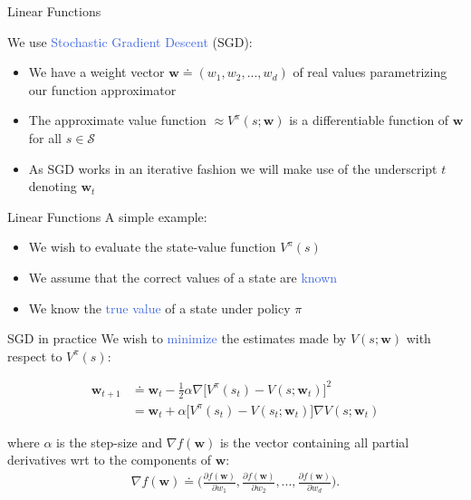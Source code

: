 \documentclass{beamer}
\begin{document}
\begin{frame}{Linear Functions}
	\begin{center}
		We use \textcolor{RoyalBlue}{Stochastic Gradient Descent} (SGD):
	\end{center}
	
	\bigskip

	\begin{itemize}
		\item We have a weight vector $\mathbf{w}\doteq(w_1, w_2, ..., w_d)$ of real values parametrizing our function approximator
		\item The approximate value function $\approx V^{\pi}(s;\mathbf{w})$ is a differentiable function of $\mathbf{w}$ for all $s\in\mathcal{S}$
		\item As SGD works in an iterative fashion we will make use of the underscript $t$ denoting $\mathbf{w}_t$
	\end{itemize}
\end{frame}


\begin{frame}{Linear Functions}
	A simple example:
	\begin{itemize}
		\item We wish to evaluate the state-value function $V^\pi(s)$
		\item We assume that the correct values of a state are \textcolor{RoyalBlue}{known} 
		\item We know the \textcolor{RoyalBlue}{true value} of a state under policy $\pi$
	\end{itemize}

	\begin{block}{SGD in practice}
		We wish to \textcolor{RoyalBlue}{minimize} the estimates made by $V(s;\mathbf{w})$ with respect to $V^{\pi}(s)$:
		
		\begin{align*}
			\mathbf{w}_{t+1} & \doteq \mathbf{w}_t - \frac{1}{2} \alpha\nabla\Big[V^{\pi}(s_t)-V(s;\mathbf{w}_t)\Big]^{2} \\ 
					 & = \mathbf{w}_t +\alpha\Big[V^{\pi}(s_t)-V(s_t;\mathbf{w}_t)\Big]\nabla V(s;\mathbf{w}_t)
		\end{align*}

		where $\alpha$ is the step-size and $\nabla f(\mathbf{w})$ is the vector containing all partial derivatives wrt to the components of $\mathbf{w}$:
		\begin{align*}
			\nabla f(\mathbf{w}) \doteq \Big(\frac{\partial f(\mathbf{w})}{\partial w_1}, \frac{\partial f(\mathbf{w})}{\partial w_2}, ..., \frac{\partial f(\mathbf{w})}{\partial w_d}\Big).
		\end{align*}

	\end{block}
\end{frame}
\end{document}
